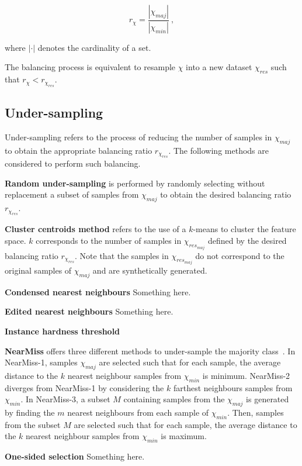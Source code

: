 \documentclass[twoside,11pt]{article}
\begin{document}
\begin{equation}
r_{\chi} = \frac{|\chi_{maj}|}{|\chi_{min}|} \ ,
\end{equation}

\noindent where $|\cdot|$ denotes the cardinality of a set.

The balancing process is equivalent to resample $\chi$ into a new dataset $\chi_{res}$ such that $r_{\chi} < r_{\chi_{res}}$.

\subsection{Under-sampling}

Under-sampling refers to the process of reducing the number of samples in $\chi_{maj}$ to obtain the appropriate balancing ratio $r_{\chi_{res}}$.
The following methods are considered to perform such balancing.

\textbf{Random under-sampling} is performed by randomly selecting without replacement a subset of samples from $\chi_{maj}$ to obtain the desired balancing ratio $r_{\chi_{res}}$.

\textbf{Cluster centroids method} refers to the use of a $k$-means to cluster the feature space.
$k$ corresponds to the number of samples in $\chi_{res_{maj}}$ defined by the desired balancing ratio $r_{\chi_{res}}$.
Note that the samples in $\chi_{res_{maj}}$ do not correspond to the original samples of $\chi_{maj}$ and are synthetically generated.

\textbf{Condensed nearest neighbours} Something here.

\textbf{Edited nearest neighbours} Something here.

\textbf{Instance hardness threshold}

\textbf{NearMiss} offers three different methods to under-sample the majority class~\citep{mani2003knn}.
In NearMiss-1, samples $\chi_{maj}$ are selected such that for each sample, the average distance to the $k$ nearest neighbour samples from $\chi_{min}$ is minimum.
NearMiss-2 diverges from NearMiss-1 by considering the $k$ farthest neighbours samples from $\chi_{min}$.
In NearMiss-3, a subset $M$ containing samples from the $\chi_{maj}$ is generated by finding the $m$ nearest neighbours from each sample of $\chi_{min}$.
Then, samples from the subset $M$ are selected such that for each sample, the average distance to the $k$ nearest neighbour samples from $\chi_{min}$ is maximum.

\textbf{One-sided selection} Something here.
\end{document}
